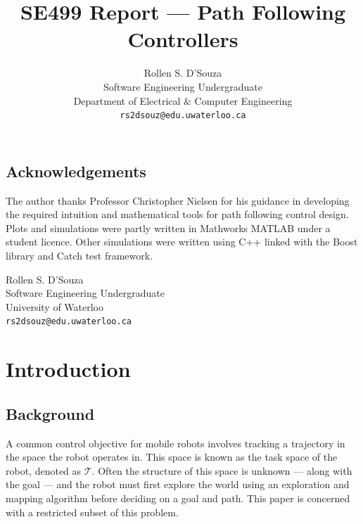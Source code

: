 \documentclass[oneside, 11pt]{book}
\author{{Rollen S. D'Souza}\\
        {Software Engineering Undergraduate}\\
        {Department of Electrical \& Computer Engineering}\\
        {\texttt{rs2dsouz@edu.uwaterloo.ca}}}
\title{\textbf{SE499 Report --- Path Following Controllers}}
\date{}
\begin{document}
\maketitle

\frontmatter
\section*{Acknowledgements}
The author thanks Professor Christopher Nielsen for his guidance in developing the required intuition and mathematical tools for path following control design. Plots and simulations were partly written in Mathworks MATLAB under a student licence. Other simulations were written using C++ linked with the Boost library\cite{boost} and Catch test framework\cite{catch}.

\begin{flushright}
Rollen S. D'Souza\\
Software Engineering Undergraduate\\
University of Waterloo\\
\texttt{rs2dsouz@edu.uwaterloo.ca}
\end{flushright}

\tableofcontents

\printnomenclature[3cm]
\listoffigures
\listoftables


\mainmatter
\pagestyle{fancy}
\renewcommand{\sectionmark}[1]{\markright{\thesection.\ #1}}

\chapter{Introduction}

\section{Background}
A common control objective for mobile robots involves tracking a trajectory in the space the robot operates in. This space is known as the task space of the robot, denoted as $\mathcal{T}$. Often the structure of this space is unknown --- along with the goal --- and the robot must first explore the world using an exploration and mapping algorithm before deciding on a goal and path.  This paper is concerned with a restricted subset of this problem.
\end{document}
